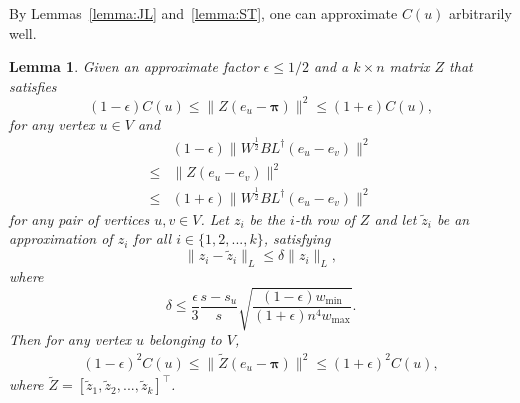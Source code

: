 \documentclass[sigconf]{acmart}
\newtheorem{lemma}[theorem]{Lemma}
\newtheorem{fact}[theorem]{Fact}
\newcommand\ppi{\boldsymbol{\pi}}
\newcommand\ee{\boldsymbol{\mathit{e}}}
\newcommand\zz{\boldsymbol{\mathit{z}}}
\newcommand\BB{\boldsymbol{\mathit{B}}}
\newcommand\LL{\boldsymbol{\mathit{L}}}
\newcommand\WW{\boldsymbol{\mathit{W}}}
\newcommand\ZZtil{\boldsymbol{\mathit{\tilde{Z}}}}
\newcommand\ZZ{\boldsymbol{\mathit{Z}}}
\newcommand\Otil{\widetilde{O}}
\begin{document}
By Lemmas~\ref{lemma:JL} and~\ref{lemma:ST},  one can  approximate  $C(u)$ arbitrarily well.
\begin{lemma}\label{lem:error1}
	Given an approximate factor $\epsilon \le 1/2$ and a $k\times n$ matrix $\ZZ$ that satisfies
	\[
		(1-\epsilon) C(u)
		\leq
		\|\ZZ (\ee_{u} - \ppi)\|^{2}
		\leq
		(1+\epsilon)  C(u),
	\]
	for any vertex $u\in V$ and
	\begin{align*}
		     & (1-\epsilon) \|\WW^{\frac{1}{2}} \BB \LL^{\dagger} (\ee_u-\ee_v)\|^2 \\
		\leq &
		\|\ZZ (\ee_u - \ee_v)\|^2                                                   \\
		\leq &
		(1+\epsilon) \|\WW^{\frac{1}{2}} \BB \LL^{\dagger} (\ee_u-\ee_v)\|^2
	\end{align*}
	for any pair of vertices $u,v \in V$.
	Let $\zz_i$ be the $i$-th row of $\ZZ$ and let $\tilde{\zz}_i$ be an approximation of $\zz_i$ for all $i \in \{1,2,...,k\}$, satisfying
	\begin{equation}\label{EE13} \|\zz_i-\tilde{\zz}_i\|_{\LL}\le\delta
		\|\zz_{i}\|_{\LL},
	\end{equation}
	where
	\begin{equation}\label{EE14}
		\delta \leq  \frac{\epsilon }{3} \frac{s-s_u}{s}
		\sqrt{\frac{(1-\epsilon) w_{\min}}{(1+\epsilon) n^4 w_{\max}}}.
	\end{equation}
	Then for any vertex $u$ belonging to $V$,
	\begin{align}
		\label{EE15}
		(1 - \epsilon)^2  C(u)
		\leq
		\|\ZZtil  (\ee_{u} - \ppi)\|^2
		\leq
		(1 + \epsilon)^2  C(u),
	\end{align}
	where $\ZZtil = [\tilde{\zz}_1, \tilde{\zz}_2, ..., \tilde{\zz}_k]^\top$.
\end{lemma}
\end{document}
